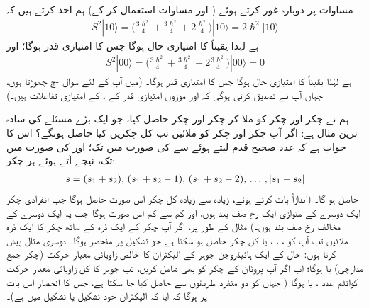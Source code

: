  مساوات    پر دوبارہ غور کرتے ہوئے ( اور مساوات  استعمال کر کے)  ہم   اخذ کرتے ہیں کہ 
\begin{align}\label{مساوات_تین_ابعاد_ایک_صفر_بعد_درکار}
S^2 | 1 0 \rangle = \big ( \frac{3\hslash^2}{4} + \frac{3\hslash^2}{4} +2 \frac{ \hslash^2}{4} \big ) | 1 0 \rangle =2\hslash^2 |1 0\rangle
\end{align}
ہے لہٰذا  یقیناً  کا امتیازی حال ہوگا جس کا امتیازی قدر  ہوگا؛  اور 
\begin{align}
S^2 | 0 0 \rangle = \big ( \frac{3\hslash^2}{4} + \frac{3\hslash^2}{4} -2 \frac{3 \hslash^2}{4} \big ) | 0 0 \rangle =0
\end{align}
ہے  لہٰذا  یقیناً  کا امتیازی حال ہوگا جس کا امتیازی قدر  ہوگا۔  (میں آپ کے لئے سوال -ج  چھوڑتا   ہوں،  جہاں آپ نے تصدیق کرنی  ہوگی کہ  اور موزوں  امتیازی قدر کے ،   کے امتیازی تفاعلات ہیں۔)

 ہم نے  چکر اور  چکر کو ملا کر    چکر اور    چکر حاصل کیا،  جو ایک  بڑے مسئلے کی سادہ ترین مثال ہے:  اگر آپ  چکر اور  چکر کو ملائیں  تب کل چکریں   کیا  حاصل ہونگے؟   اس کا جواب  ہے کہ عدد صحیح قدم لیتے ہوئے  سے  کی صورت میں  تک؛  اور  کی صورت میں  تک،  نیچے آتے ہوئے  ہر چکر: 
\begin{align}
s=(s_1+s_2), \,(s_1+s_2-1),\, (s_1+s_2-2), \,\dotsc \, , \,\abs{s_1-s_2}
\end{align}
حاصل ہو گا۔ (اندازاً بات کرتے ہوئے، زیادہ سے زیادہ  کل چکر اس صورت حاصل ہوگا جب انفرادی چکر ایک دوسرے کے متوازی ایک رخ صف بند ہوں،  اور کم سے کم اس صورت ہوگا جب یہ ایک دوسرے کے مخالف رخ صف بند ہوں۔)  مثال کے طور پر،  اگر آپ  چکر کے ایک ذرہ کے ساتھ    چکر کا  ایک ذرہ  ملائیں تب آپ کو ،  ،  ،  یا   کل چکر حاصل ہو  سکتا ہے  جو  تشکیل  پر منحصر ہوگا۔  دوسری مثال پیش کرتا ہوں:  حال  کے ایک ہائیڈروجن جوہر کے الیکٹران کا خالص  زاویائی معیار حرکت (چکر
 جمع مدارچی)   یا  ہوگا؛  اب اگر آپ پروٹان کے چکر کو بھی شامل کریں، تب جوہر کا کل زاویائی معیار حرکت کوانٹم عدد ،   یا  ہوگا ( جہاں  کو دو منفرد طریقوں سے حاصل کیا جا سکتا ہے، جس کا انحصار اس بات پر ہوگا کہ آیا کہ الیکٹران خود     تشکیل یا  تشکیل  میں  ہے)۔

